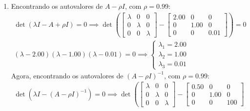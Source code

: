 \documentclass[a4paper,11pt]{article}
\begin{document}
\begin{enumerate}[label=\textbf{(\alph*)}]
            \item Encontrando os autovalores de $A - \rho I$, com $\rho = 0.99$:
            $$
                \begin{matrix}
                    \det(\lambda I - A + \rho I) = 0 \implies \det \left (
                    \begin{bmatrix}
                        \lambda & 0 & 0 \\
                        0 & \lambda & 0 \\
                        0 & 0 & \lambda
                    \end{bmatrix}
                    -
                    \begin{bmatrix}
                        2.00 & 0 & 0 \\
                        0 & 1.00 & 0\\
                        0 & 0 & 0.01
                    \end{bmatrix}
                    \right ) = 0
                    \\
                    (\lambda - 2.00)(\lambda - 1.00)(\lambda - 0.01) = 0
                    \implies
                    \begin{cases}
                        \lambda_1 = 2.00
                        \\
                        \lambda_2 = 1.00
                        \\
                        \lambda_3 = 0.01
                    \end{cases}
                \end{matrix}
            $$
            Agora, encontrando os autovalores de $(A - \rho I)^{-1}$, com $\rho = 0.99$:
            $$
                \begin{matrix}
                    \det(\lambda I - (A - \rho I)^{-1}) = 0 \implies \det \left (
                    \begin{bmatrix}
                        \lambda & 0 & 0 \\
                        0 & \lambda & 0 \\
                        0 & 0 & \lambda
                    \end{bmatrix}
                    -
                    \begin{bmatrix}
                        0.50 & 0 & 0 \\
                        0 & 1.00 & 0\\
                        0 & 0 & 100
                    \end{bmatrix}

\end{matrix}$$
\end{enumerate}
\end{document}
